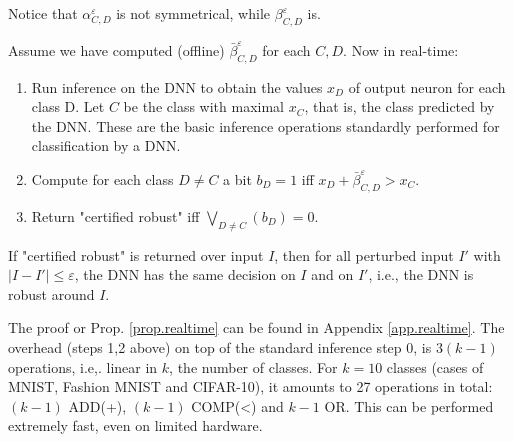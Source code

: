 Notice that  
$\alpha^{\varepsilon}_{C,D}$ is not symmetrical, while 
$\beta^{\varepsilon}_{C,D}$ is.
\fi

    
Assume we have computed (offline) $\bar{\beta}^{\varepsilon}_{C,D}$ for each $C,D$. Now in real-time:
\begin{enumerate}  
  \item[0] Run inference on the DNN to obtain the values $x_D$ of output neuron for each class D. Let $C$ be the class with maximal $x_{C}$, that is, the class predicted by the DNN. These are the basic inference operations standardly performed for classification by a DNN.
  \item[1] Compute for each class $D \neq C$
  a bit $b_D=1$ iff $x_D +\bar{\beta}^{\varepsilon}_{C,D} > x_C$.
  \item[2] Return "certified robust" iff $\bigvee_{D \neq C}(b_D)=0$.
\end{enumerate}

\begin{proposition}
  \label{prop.realtime}
  If "certified robust" is returned over input $I$, 
  then for all perturbed input $I'$ with  $|I - I'| \leq \varepsilon$,
  the DNN has the same decision on $I$ and on $I'$, i.e., the DNN is robust around $I$. %
\end{proposition}

The proof or Prop. \ref{prop.realtime} can be found in Appendix 
\ref{app.realtime}.
The overhead (steps 1,2 above) on top of the standard inference step 0, is $3(k-1)$ operations, i.e,. linear in $k$, the number of classes.
For $k=10$ classes (cases of MNIST, Fashion MNIST and CIFAR-10), it amounts to 27 operations in total: $(k-1)$ ADD(+), 
$(k-1)$ COMP(<) and $k-1$ OR. This can be performed extremely fast, even on limited hardware.
